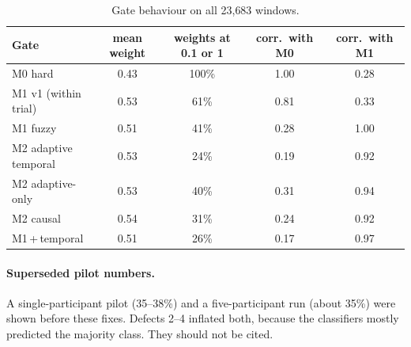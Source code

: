 \documentclass[10pt,a4paper]{article}
\begin{document}
\begin{table}[h]
\centering\small
\caption{Gate behaviour on all 23{,}683 windows.}\label{tab:gates}
\begin{tabular}{@{}lcccc@{}}
\toprule
Gate & mean weight & weights at 0.1 or 1 & corr.\ with M0 & corr.\ with M1\\
\midrule
M0 hard & 0.43 & 100\% & 1.00 & 0.28\\
M1 v1 (within trial) & 0.53 & 61\% & 0.81 & 0.33\\
M1 fuzzy & 0.51 & 41\% & 0.28 & 1.00\\
M2 adaptive temporal & 0.53 & 24\% & 0.19 & 0.92\\
M2 adaptive-only & 0.53 & 40\% & 0.31 & 0.94\\
M2 causal & 0.54 & 31\% & 0.24 & 0.92\\
M1\,+\,temporal & 0.51 & 26\% & 0.17 & 0.97\\
\bottomrule
\end{tabular}
\end{table}

\paragraph{Superseded pilot numbers.} A single-participant pilot (35--38\%) and a five-participant run (about 35\%) were shown before these fixes. Defects 2--4 inflated both, because the classifiers mostly predicted the majority class. They should not be cited.
\end{document}
